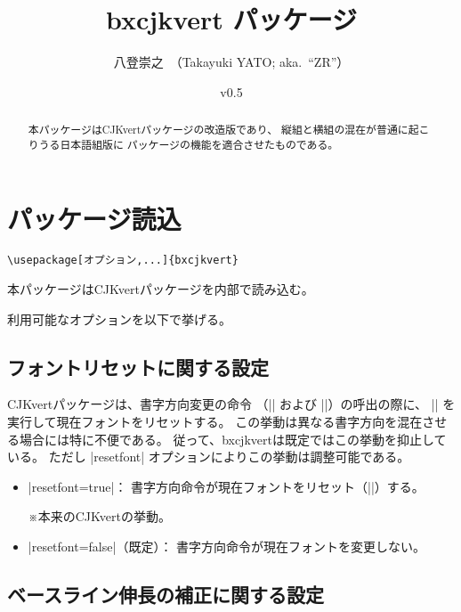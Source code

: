 \documentclass[a4paper]{ltjsarticle}
\newcommand{\PkgVersion}{0.5}
\newcommand{\PkgDate}{2023/07/23}
\newcommand{\Pkg}[1]{\textsf{#1}}
\newcommand{\Note}{\par\noindent ※}
\newcommand{\Means}{：\quad}
\begin{document}
\title{\Pkg{bxcjkvert} パッケージ}
\author{八登崇之\ （Takayuki YATO; aka.~``ZR''）}
\date{v\PkgVersion\quad[\PkgDate]}
\maketitle

\begin{abstract}
本パッケージは\Pkg{CJKvert}パッケージの改造版であり、
縦組と横組の混在が普通に起こりうる日本語組版に
パッケージの機能を適合させたものである。
\end{abstract}

\tableofcontents

\section{パッケージ読込}
\label{sec:loading}

\begin{verbatim}
\usepackage[オプション,...]{bxcjkvert}
\end{verbatim}

本パッケージは\Pkg{CJKvert}パッケージを内部で読み込む。

利用可能なオプションを以下で挙げる。

\subsection{フォントリセットに関する設定}

\Pkg{CJKvert}パッケージは、書字方向変更の命令
（|\CJKhorz| および |\CJKvert|）の呼出の際に、
|\normalfont| を実行して現在フォントをリセットする。
この挙動は異なる書字方向を混在させる場合には特に不便である。
従って、\Pkg{bxcjkvert}は既定ではこの挙動を抑止している。
ただし |resetfont| オプションによりこの挙動は調整可能である。

\begin{itemize}
\item |resetfont=true|\Means
  書字方向命令が現在フォントをリセット（|\normalfont|）する。
  \Note 本来の\Pkg{CJKvert}の挙動。
\item |resetfont=false|（既定）\Means
  書字方向命令が現在フォントを変更しない。
\end{itemize}

\subsection{ベースライン伸長の補正に関する設定}
\end{document}
